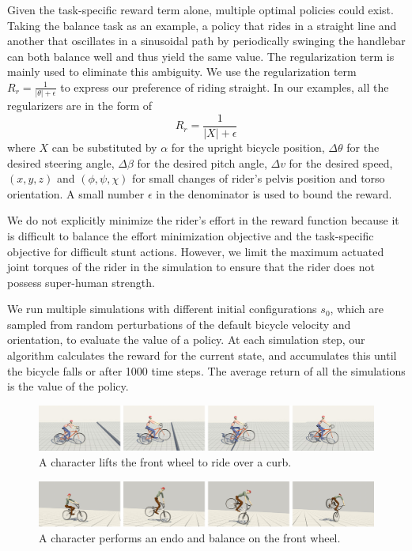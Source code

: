 Given the task-specific reward term alone, multiple optimal policies could exist. Taking the balance task as an example, a policy that rides in a straight line and another that oscillates in a sinusoidal path by periodically swinging the handlebar can both balance well and thus yield the same value. The regularization term is mainly used to eliminate this ambiguity. We use the regularization term $R_r=\frac{1}{|\theta|+\epsilon}$ to express our preference of riding straight. In our examples, all the regularizers are in the form of
\begin{displaymath}
R_r = \frac{1}{|X|+\epsilon}
\end{displaymath}
where $X$ can be substituted by $\alpha$ for the upright bicycle position, $\Delta \theta$ for the desired steering angle, $\Delta \beta$ for the desired pitch angle, $\Delta v$ for the desired speed, $(x, y, z)$ and $(\phi, \psi, \chi)$ for small changes of rider's pelvis position and torso orientation. A small number $\epsilon$ in the denominator is used to bound the reward.

We do not explicitly minimize the rider's effort in the reward function because it is difficult to balance the effort minimization objective and the task-specific objective for difficult stunt actions. However, we limit the maximum actuated joint torques of the rider in the simulation to ensure that the rider does not possess super-human strength.

We run multiple simulations with different initial configurations $s_0$, which are sampled from random perturbations of the default bicycle velocity and orientation, to evaluate the value of a policy. At each simulation step, our algorithm calculates the reward for the current state, and accumulates this until the bicycle falls or after 1000 time steps. The average return of all the simulations is the value of the policy.

\begin{figure}[!t]
\centering
\includegraphics[width=\textwidth]{figures/Curb}
\caption{A character lifts the front wheel to ride over a curb.}
\label{fig:curb}
\end{figure}

\begin{figure}[!t]
\centering
\includegraphics[width=\textwidth]{figures/endo}
\caption{A character performs an endo and balance on the front wheel.}
\vspace{-0.1in}
\label{fig:endo}
\end{figure}


